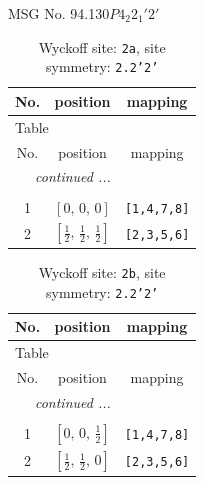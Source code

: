 \documentclass[fleqn,8pt]{jsarticle}
\begin{document}
\setcounter{MaxMatrixCols}{32}

\renewcommand{\tablename}{Table~}
\renewcommand{\figurename}{Figure~}
\begin{center}
\LARGE
MSG No. 94.130\quad$P4_{2}2_{1}'2'$
\end{center}
\renewcommand{\arraystretch}{1.2}
\begin{longtable}{ccc}
\caption{Wyckoff site: {\tt 2a}, site symmetry: {\tt 2.2'2'}}
 \\
 \hline \hline
No. & position & mapping \\ \hline \endfirsthead

\multicolumn{2}{l}{\tablename\ \thetable{}} \\
 \hline \hline
No. & position & mapping \\ \hline \endhead

 \hline \hline
\multicolumn{2}{r}{\footnotesize\it continued ...} \\ \endfoot

 \hline \hline
\multicolumn{2}{r}{} \\ \endlastfoot

1 & $\left[ 0,\, 0,\, 0 \right]$ & {\tt [1,4,7,8]} \\ \hline
2 & $\left[ \frac{1}{2},\, \frac{1}{2},\, \frac{1}{2} \right]$ & {\tt [2,3,5,6]} \\
\end{longtable}
\renewcommand{\arraystretch}{1.2}
\begin{longtable}{ccc}
\caption{Wyckoff site: {\tt 2b}, site symmetry: {\tt 2.2'2'}}
 \\
 \hline \hline
No. & position & mapping \\ \hline \endfirsthead

\multicolumn{2}{l}{\tablename\ \thetable{}} \\
 \hline \hline
No. & position & mapping \\ \hline \endhead

 \hline \hline
\multicolumn{2}{r}{\footnotesize\it continued ...} \\ \endfoot

 \hline \hline
\multicolumn{2}{r}{} \\ \endlastfoot

1 & $\left[ 0,\, 0,\, \frac{1}{2} \right]$ & {\tt [1,4,7,8]} \\ \hline
2 & $\left[ \frac{1}{2},\, \frac{1}{2},\, 0 \right]$ & {\tt [2,3,5,6]} \\
\end{longtable}
\end{document}
